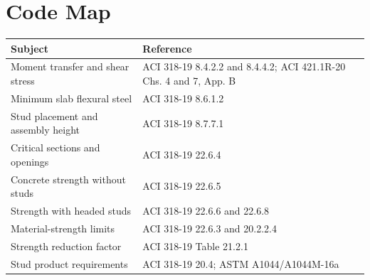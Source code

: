 \documentclass[10pt]{article}
\begin{document}
\section{Code Map}

{\small
\begin{tabularx}{\linewidth}{@{}p{2.15in}X@{}}
\toprule
\textbf{Subject} & \textbf{Reference} \\
\midrule
Moment transfer and shear stress & ACI 318-19 8.4.2.2 and 8.4.4.2;
ACI 421.1R-20 Chs. 4 and 7, App. B \\
Minimum slab flexural steel & ACI 318-19 8.6.1.2 \\
Stud placement and assembly height & ACI 318-19 8.7.7.1 \\
Critical sections and openings & ACI 318-19 22.6.4 \\
Concrete strength without studs & ACI 318-19 22.6.5 \\
Strength with headed studs & ACI 318-19 22.6.6 and 22.6.8 \\
Material-strength limits & ACI 318-19 22.6.3 and 20.2.2.4 \\
Strength reduction factor & ACI 318-19 Table 21.2.1 \\
Stud product requirements & ACI 318-19 20.4; ASTM A1044/A1044M-16a \\
\bottomrule
\end{tabularx}
}
\end{document}
